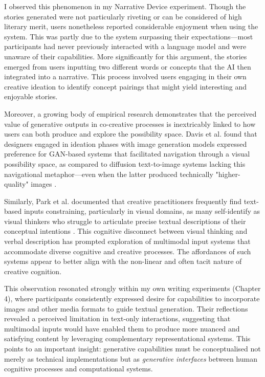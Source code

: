 I observed this phenomenon in my Narrative Device experiment. Though the stories generated were not particularly riveting or can be considered of high literary merit, users nonetheless reported considerable enjoyment when using the system. This was partly due to the system surpassing their expectations—most participants had never previously interacted with a language model and were unaware of their capabilities. More significantly for this argument, the stories emerged from users inputting two different words or concepts that the AI then integrated into a narrative. This process involved users engaging in their own creative ideation to identify concept pairings that might yield interesting and enjoyable stories.

Moreover, a growing body of empirical research demonstrates that the perceived value of generative outputs in co-creative processes is inextricably linked to how users can both produce and explore the possibility space. Davis et al. found that designers engaged in ideation phases with image generation models expressed preference for GAN-based systems that facilitated navigation through a visual possibility space, as compared to diffusion text-to-image systems lacking this navigational metaphor—even when the latter produced technically "higher-quality" images \cite{Davis2024-ml}. 

Similarly, Park et al. documented that creative practitioners frequently find text-based inputs constraining, particularly in visual domains, as many self-identify as visual thinkers who struggle to articulate precise textual descriptions of their conceptual intentions \cite{Park2024-gw}. This cognitive disconnect between visual thinking and verbal description has prompted exploration of multimodal input systems that accommodate diverse cognitive and creative processes. The affordances of such systems appear to better align with the non-linear and often tacit nature of creative cognition.

This observation resonated strongly within my own writing experiments (Chapter 4), where participants consistently expressed desire for capabilities to incorporate images and other media formats to guide textual generation. Their reflections revealed a perceived limitation in text-only interactions, suggesting that multimodal inputs would have enabled them to produce more nuanced and satisfying content by leveraging complementary representational systems. This points to an important insight: generative capabilities must be conceptualised not merely as technical implementations but as \textit{generative interfaces} between human cognitive processes and computational systems.

